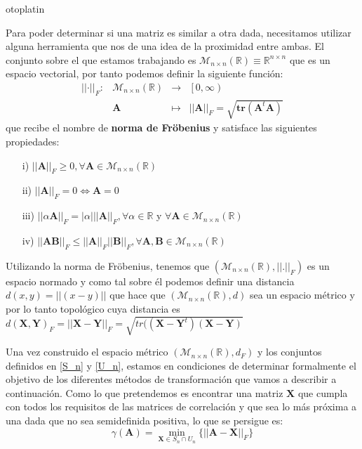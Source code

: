 otoplatin\documentclass[a4paper,openright,12pt]{report}
\begin{document}
Para poder determinar si una matriz es similar a otra dada, necesitamos utilizar alguna herramienta que nos de una idea de la proximidad entre ambas. El conjunto sobre el que estamos trabajando es $\mathcal{M}_{n\times n}(\mathbb{R})\equiv \mathbb{R}^{n\times n}$ que es un espacio vectorial, por tanto podemos definir la siguiente función:
\begin{equation}
\begin{array}{cccc}
\vert\vert \cdot \vert\vert_{F}: & \mathcal{M}_{n\times n}(\mathbb{R}) & \longrightarrow & \left[0,\infty\right)   \\
 & \mathbf{A} & \mapsto & \vert\vert \mathbf{A} \vert\vert_{F} =\sqrt{\mathbf{tr}(\mathbf{A}^{t}\mathbf{A})}
\end{array}
\label{norma_frob}
\end{equation}
que recibe el nombre de \textbf{norma de Fröbenius} y satisface las siguientes propiedades:
\begin{itemize}
\item[i)] $\vert\vert \mathbf{A}\vert\vert_{F} \geq 0, \forall \mathbf{A}\in \mathcal{M}_{n\times n}(\mathbb{R})$
\item[ii)] $\vert\vert \mathbf{A}\vert\vert_{F} = 0 \Leftrightarrow \mathbf{A}=0$
\item[iii)] $\vert\vert \alpha\mathbf{A}\vert\vert_{F}=\vert\alpha\vert \vert\vert \mathbf{A}\vert\vert_{F}, \forall \alpha \in \mathbb{R}$ y $\forall \mathbf{A}\in \mathcal{M}_{n\times n}(\mathbb{R})$
\item[iv)] $\vert\vert \mathbf{A}\mathbf{B}\vert\vert_{F} \leq \vert\vert \mathbf{A}\vert\vert_{F}\vert\vert \mathbf{B}\vert\vert_{F}, \forall \mathbf{A},\mathbf{B} \in \mathcal{M}_{n\times n}(\mathbb{R})$
\end{itemize}

Utilizando la norma de Fröbenius, tenemos que $(\mathcal{M}_{n\times n}(\mathbb{R}),\vert\vert.\vert\vert_{F})$ es un espacio normado y como tal sobre él podemos definir una distancia $d(x,y)=\vert\vert(x-y)\vert\vert$ que hace que $(\mathcal{M}_{n\times n}(\mathbb{R}),d)$ sea un espacio métrico y por lo tanto topológico cuya distancia es $d(\mathbf{X},\mathbf{Y})_{F}=\vert\vert \mathbf{X}-\mathbf{Y}\vert\vert_{F}=\sqrt{tr((\mathbf{X-Y}^{t})(\mathbf{X-Y})}$

Una vez construido el espacio métrico $(\mathcal{M}_{n\times n}(\mathbb{R}),d_{F})$ y los conjuntos definidos en \ref{S_n} y \ref{U_n}, estamos en condiciones de determinar formalmente el objetivo de los diferentes métodos de transformación que vamos a describir a continuación. Como lo que pretendemos es encontrar una matriz $\mathbf{X}$ que cumpla con todos los requisitos de las matrices de correlación y que sea lo más próxima a una dada que no sea semidefinida positiva, lo que se persigue es:
\begin{equation}
\gamma(\mathbf{A})=\min_{\mathbf{X} \in S_{n} \cap U_{n}}\lbrace\vert\vert \mathbf{A}-\mathbf{X} \vert\vert_{F}\rbrace
\label{min_dist_frob}
\end{equation}
\end{document}

